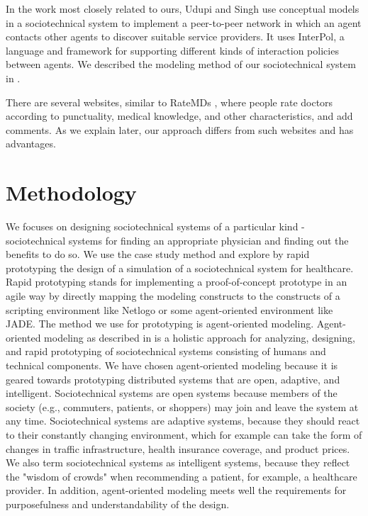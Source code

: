 In the work most closely related to ours, Udupi and Singh \cite{udupi2010} use conceptual models in a sociotechnical system to implement a peer-to-peer network in which an agent contacts other agents to discover suitable service providers. It uses InterPol, a language and framework for supporting different kinds of interaction policies between agents. We described the modeling method of our sociotechnical system in \cite{taveter2012}.

There are several websites, similar to RateMDs \cite{ratemds}, where people rate doctors according to punctuality, medical knowledge, and other characteristics, and add comments. As we explain later, our approach differs from such websites and has advantages.

\section{Methodology}
\label{ch3:methodology}
We focuses on designing sociotechnical systems of a particular kind - sociotechnical systems for finding an appropriate physician and finding out the benefits to do so. We use the case study method \cite{taveter2012} and explore by rapid prototyping the design of a simulation of a sociotechnical system for healthcare. Rapid prototyping stands for implementing a proof-of-concept prototype in an agile way by directly mapping the modeling constructs to the constructs of a scripting environment like Netlogo or some agent-oriented environment like JADE. The method we use for prototyping is agent-oriented modeling. Agent-oriented modeling as described in \cite{sterling2009} is a holistic approach for analyzing, designing, and rapid prototyping of sociotechnical systems consisting of humans and technical components. We have chosen agent-oriented modeling because it is geared towards prototyping distributed systems that are open, adaptive, and intelligent. Sociotechnical systems are open systems because members of the society (e.g., commuters, patients, or shoppers) may join and leave the system at any time. Sociotechnical systems are adaptive systems, because they should react to their constantly changing environment, which for example can take the form of changes in traffic infrastructure, health insurance coverage, and product prices. We also term sociotechnical systems as intelligent systems, because they reflect the "wisdom of crowds" when recommending a patient, for example, a healthcare provider. In addition, agent-oriented modeling meets well the requirements for purposefulness and understandability of the design.

